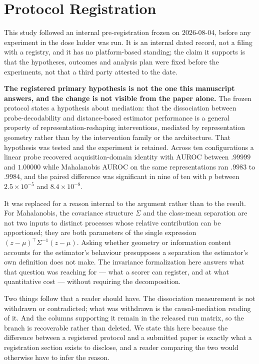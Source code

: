 \documentclass[11pt,a4paper]{article}
\begin{document}
\section*{Protocol Registration}
This study followed an internal pre-registration frozen on 2026-08-04, before
any experiment in the dose ladder was run. It is an internal dated record, not
a filing with a registry, and it has no platform-based standing; the claim it
supports is that the hypotheses, outcomes and analysis plan were fixed before
the experiments, not that a third party attested to the date.

\textbf{The registered primary hypothesis is not the one this manuscript
answers, and the change is not visible from the paper alone.} The frozen
protocol states a hypothesis about mediation: that the dissociation between
probe-decodability and distance-based estimator performance is a general
property of representation-reshaping interventions, mediated by representation
geometry rather than by the intervention family or the architecture. That
hypothesis was tested and the experiment is retained. Across ten
configurations a linear probe recovered acquisition-domain identity with AUROC
between $.99999$ and $1.00000$ while Mahalanobis AUROC on the same
representations ran $.9983$ to $.9984$, and the paired difference was
significant in nine of ten with $p$ between $2.5\times10^{-5}$ and
$8.4\times10^{-8}$.

It was replaced for a reason internal to the argument rather than to the
result. For Mahalanobis, the covariance structure $\Sigma$ and the class-mean
separation are not two inputs to distinct processes whose relative contribution
can be apportioned; they are both parameters of the single expression
$(z-\mu)^\top\Sigma^{-1}(z-\mu)$. Asking whether geometry or information content
accounts for the estimator's behaviour presupposes a separation the estimator's
own definition does not make. The invariance formalization here answers what
that question was reaching for --- what a scorer can register, and at what
quantitative cost --- without requiring the decomposition.

Two things follow that a reader should have. The dissociation measurement is
not withdrawn or contradicted; what was withdrawn is the causal-mediation
reading of it. And the columns supporting it remain in the released run matrix,
so the branch is recoverable rather than deleted. We state this here because
the difference between a registered protocol and a submitted paper is exactly
what a registration section exists to disclose, and a reader comparing the two
would otherwise have to infer the reason.
\end{document}
